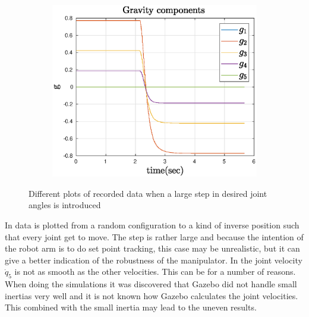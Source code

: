 \begin{figure}[htbp]
    ~
    \begin{subfigure}[htbp]{0.45\textwidth}
        \centering
        \includegraphics[width = \picsSiz\linewidth]{img/LSgrav.eps}
        \caption{ }
    \end{subfigure}
    \caption{Different plots of recorded data when a large step in desired joint angles is introduced}
    \label{fig:LS}
\end{figure}
In  data is plotted from a random configuration to a kind of inverse position such that every joint get to move. The step is rather large and because the intention of the robot arm is to do set point tracking, this case may be unrealistic, but it can give a better indication of the robustness of the manipulator. In  the joint velocity $\dot{q}_5$ is not as smooth as the other velocities. This can be for a number of reasons. When doing the simulations it was discovered that Gazebo did not handle small inertias very well and it is not known how Gazebo calculates the joint velocities. This combined with the small inertia may lead to the uneven results. %



